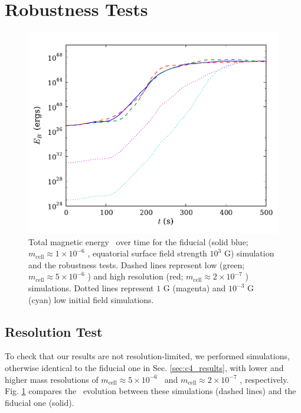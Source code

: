 \section{Robustness Tests}
\label{sec:c4_robust}

\begin{figure}
\centering
\includegraphics[angle=0,width=0.7\columnwidth]{chapter4_zhu+15/figures/bcomp.pdf}
\caption{Total magnetic energy \EB\ over time for the fiducial (solid blue; $m_\mathrm{cell} \approx 1\times10^{-6}$ \Msun, equatorial surface field strength $10^3$ G) simulation and the robustness tests.  Dashed lines represent low (green; $m_\mathrm{cell} \approx 5\times10^{-6}$ \Msun) and high resolution (red; $m_\mathrm{cell} \approx 2\times10^{-7}$ \Msun) simulations.  Dotted lines represent $1$ G (magenta) and $10^{-3}$ G (cyan) low initial field simulations.}
\label{fig:c4_bcomp}
\end{figure}

\subsection{Resolution Test}
\label{ssec:c4_restest}

To check that our results are not resolution-limited, we performed simulations, otherwise identical to the fiducial one in Sec. \ref{sec:c4_results}, with lower and higher mass resolutions of $m_\mathrm{cell} \approx 5\times10^{-6}$ \Msun\ and $m_\mathrm{cell} \approx 2\times10^{-7}$ \Msun, respectively.  Fig. \ref{fig:c4_bcomp} compares the \EB\ evolution between these simulations (dashed lines) and the fiducial one (solid).

